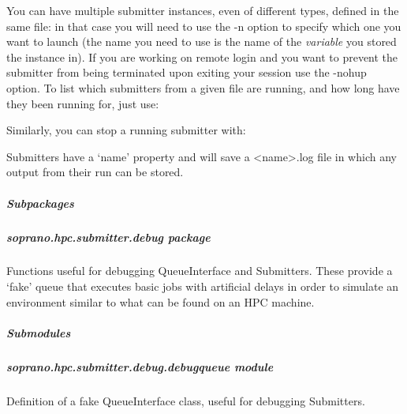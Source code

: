 \documentclass[letterpaper,10pt,english]{sphinxmanual}
\begin{document}
You can have multiple submitter instances, even of different types, defined
in the same file: in that case you will need to use the -n option to specify
which one you want to launch (the name you need to use is the name of the
\emph{variable} you stored the instance in). If you are working on remote login and
you want to prevent the submitter from being terminated upon exiting your
session use the -nohup option.
To list which submitters from a given file are running, and how long have they
been running for, just use:
\begin{quote}

\end{quote}

Similarly, you can stop a running submitter with:
\begin{quote}

\end{quote}

Submitters have a `name' property and will save a \textless{}name\textgreater{}.log file in which any
output from their run can be stored.


\subparagraph{Subpackages}
\label{doctree/soprano.hpc.submitter:subpackages}

\subparagraph{soprano.hpc.submitter.debug package}
\label{doctree/soprano.hpc.submitter.debug:module-soprano.hpc.submitter.debug}\label{doctree/soprano.hpc.submitter.debug:soprano-hpc-submitter-debug-package}\label{doctree/soprano.hpc.submitter.debug::doc}
Functions useful for debugging QueueInterface and Submitters. These
provide a `fake' queue that executes basic jobs with artificial delays
in order to simulate an environment similar to what can be found on an HPC
machine.


\subparagraph{Submodules}
\label{doctree/soprano.hpc.submitter.debug:submodules}

\subparagraph{soprano.hpc.submitter.debug.debugqueue module}
\label{doctree/soprano.hpc.submitter.debug.debugqueue:soprano-hpc-submitter-debug-debugqueue-module}\label{doctree/soprano.hpc.submitter.debug.debugqueue::doc}\label{doctree/soprano.hpc.submitter.debug.debugqueue:module-soprano.hpc.submitter.debug.debugqueue}
Definition of a fake QueueInterface class, useful for debugging Submitters.
\end{document}
